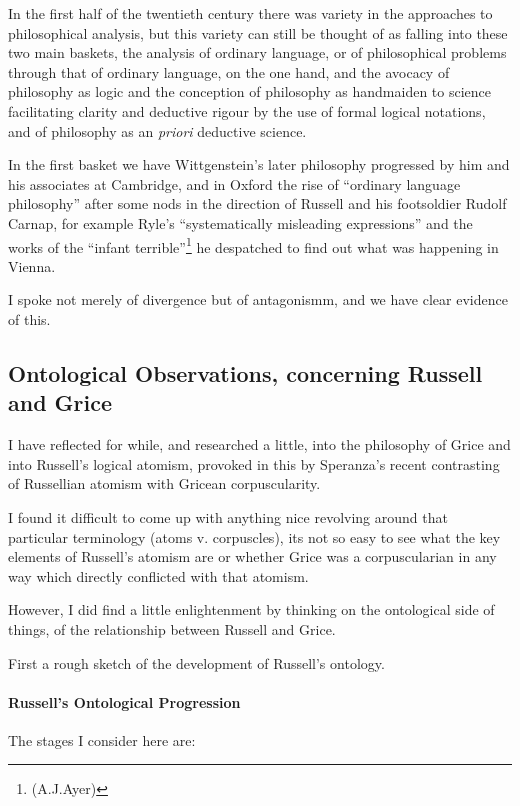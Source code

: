 \documentclass[10pt,titlepage]{article}
\begin{document}
In the first half of the twentieth century there was variety in the approaches to philosophical analysis, but this variety can still be thought of as falling into these two main baskets, the analysis of ordinary language, or of philosophical problems through that of ordinary language, on the one hand, and the avocacy of philosophy as logic and the conception of philosophy as handmaiden to science facilitating clarity and deductive rigour by the use of formal logical notations, and of philosophy as an {\it priori} deductive science.

In the first basket we have Wittgenstein's later philosophy progressed by him and his associates at Cambridge, and in Oxford the rise of ``ordinary language philosophy'' after some nods in the direction of Russell and his footsoldier Rudolf Carnap, for example Ryle's ``systematically misleading expressions'' and the works of the ``infant terrible''\footnote{(A.J.Ayer)} he despatched to find out what was happening in Vienna.


I spoke not merely of divergence but of antagonismm, and we have clear evidence of this.

\subsection{Ontological Observations, concerning Russell and Grice}

I have reflected for while, and researched a little, into the philosophy of Grice and into Russell's logical atomism, provoked in this by Speranza's recent contrasting of Russellian atomism with Gricean corpuscularity.

I found it difficult to come up with anything nice revolving around that particular terminology (atoms v. corpuscles), its not so easy to see what the key elements of Russell's atomism are or whether Grice was a corpuscularian in any way which directly conflicted with that atomism.

However, I did find a little enlightenment by thinking on the ontological side of things, of the relationship between Russell and Grice.

First a rough sketch of the development of Russell's ontology.

\paragraph{Russell's Ontological Progression}

The stages I consider here are:
\end{document}
